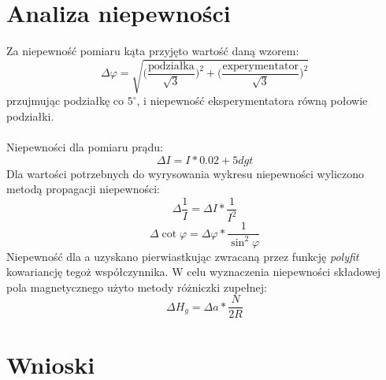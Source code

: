 \documentclass[a4paper,10pt]{article}
\begin{document}
\section{Analiza niepewności}
Za niepewność pomiaru kąta przyjęto wartość daną wzorem:
\begin{equation}
  \Delta \varphi = \sqrt{\bigg(\frac{\text{podziałka}}{\sqrt{3}}\bigg)^2+\bigg(\frac{\text{experymentator}}{\sqrt{3}}\bigg)^2}
\end{equation}
przujmując podziałkę co $5^\circ$, i niepewność eksperymentatora równą połowie podziałki.
\\
\\Niepewności dla pomiaru prądu:
\begin{equation}
  \Delta I = I*0.02+5dgt
\end{equation}
Dla wartości potrzebnych do wyrysowania wykresu niepewności wyliczono metodą propagacji niepewności:\\
\begin{equation}
  \Delta \frac{1}{I} = \Delta I * \frac{1}{I^2}
\end{equation}
\begin{equation}
  \Delta \cot{\varphi} = \Delta \varphi * \frac{1}{\sin^2{\varphi}}
\end{equation}
Niepewność dla a uzyskano pierwiastkując zwracaną przez funkcję \emph{polyfit} kowariancję tegoż współczynnika. W celu wyznaczenia niepewności składowej pola
magnetycznego użyto %
metody różniczki zupełnej:
\begin{equation}
  \Delta H_g = \Delta a * \frac{N}{2R}%
\end{equation}
\section{Wnioski}
\end{document}
